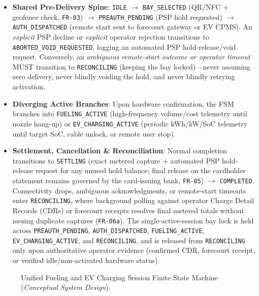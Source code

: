 \begin{itemize}[leftmargin=1.4em, itemsep=2pt]
  \item \textbf{Shared Pre-Delivery Spine}: \texttt{IDLE} $\rightarrow$ \texttt{BAY\_SELECTED} (QR/NFC + geofence check, \texttt{FR-03}) $\rightarrow$ \texttt{PREAUTH\_PENDING} (PSP hold requested) $\rightarrow$ \texttt{AUTH\_DISPATCHED} (remote start sent to forecourt gateway or EV CPMS). An \emph{explicit} PSP decline or \emph{explicit} operator rejection transitions to \texttt{ABORTED\_VOID\_REQUESTED}, logging an automated PSP hold-release/void request. Conversely, an \emph{ambiguous remote-start outcome or operator timeout} MUST transition to \texttt{RECONCILING} (keeping the bay locked)---never assuming zero delivery, never blindly voiding the hold, and never blindly retrying activation.
  \item \textbf{Diverging Active Branches}: Upon hardware confirmation, the FSM branches into \texttt{FUELING\_ACTIVE} (high-frequency volume/cost telemetry until nozzle hang-up) or \texttt{EV\_CHARGING\_ACTIVE} (periodic kWh/kW/SoC telemetry until target SoC, cable unlock, or remote user stop).
  \item \textbf{Settlement, Cancellation \& Reconciliation}: Normal completion transitions to \texttt{SETTLING} (exact metered capture + automated PSP hold-release request for any unused hold balance; final release on the cardholder statement remains governed by the card-issuing bank, \texttt{FR-05}) $\rightarrow$ \texttt{COMPLETED}. Connectivity drops, ambiguous acknowledgments, or remote-start timeouts enter \texttt{RECONCILING}, where background polling against operator Charge Detail Records (CDRs) or forecourt receipts resolves final metered totals without issuing duplicate captures (\texttt{FR-06a}). The single-active-session bay lock is held across \texttt{PREAUTH\_PENDING}, \texttt{AUTH\_DISPATCHED}, \texttt{FUELING\_ACTIVE}, \texttt{EV\_CHARGING\_ACTIVE}, and \texttt{RECONCILING}, and is released from \texttt{RECONCILING} only upon authoritative operator evidence (confirmed CDR, forecourt receipt, or verified idle/non-activated hardware status).
\end{itemize}

\begin{figure}[!htbp]
  \centering
  
  \caption{Unified Fueling and EV Charging Session Finite State Machine (\emph{Conceptual System Design}).}
  \label{fig:session-fsm}
\end{figure}

